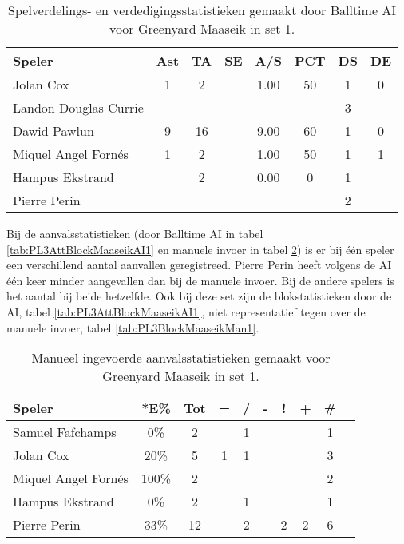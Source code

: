 \begin{table}[ht!]
  \centering
  \scriptsize
  \begin{tabular}{|l|c|c|c|c|c|c|c|} \hline
    \textbf{Speler} & Ast & TA & SE & A/S & PCT & DS & DE \\ \hline
    Jolan Cox & 1 & 2 &  & 1.00 & 50 & 1 & 0 \\
    Landon Douglas Currie &  &  &  &   &   & 3 &   \\
    Dawid Pawlun & 9 & 16 &  & 9.00 & 60 & 1 & 0 \\
    Miquel Angel Fornés & 1 & 2 &  & 1.00 & 50 & 1 & 1 \\
    Hampus Ekstrand &  & 2 &  & 0.00 & 0 & 1 & \\
    Pierre Perin &   &   &   &   &   & 2 &   \\ \hline
  \end{tabular}
  \caption[Spelverdelings- en verdedigingsstatistieken gemaakt door Balltime AI voor Greenyard Maaseik in set 1]{\label{tab:PL3SetDigMaaseikAI1}Spelverdelings- en verdedigingsstatistieken gemaakt door Balltime AI voor Greenyard Maaseik in set 1.}
\end{table}

Bij de aanvalsstatistieken (door Balltime AI in tabel \ref{tab:PL3AttBlockMaaseikAI1} en manuele invoer in tabel \ref{tab:PL3AttMaaseikMan1}) is er bij één speler een verschillend aantal aanvallen geregistreed. Pierre Perin heeft volgens de AI één keer minder aangevallen dan bij de manuele invoer. Bij de andere spelers is het aantal bij beide hetzelfde. Ook bij deze set zijn de blokstatistieken door de AI, tabel \ref{tab:PL3AttBlockMaaseikAI1}, niet representatief tegen over de manuele invoer, tabel \ref{tab:PL3BlockMaaseikMan1}.

\begin{table}[ht!]
    \centering
    \scriptsize
    \begin{tabular}{|l|c|c|c|c|c|c|c|c|c|} \hline
        \textbf{Speler} & *E\% & Tot & = & / & - & ! & + & \# \\ \hline
        Samuel Fafchamps & 0\% & 2 &  & 1 &  &  &  & 1 \\ 
        Jolan Cox & 20\% & 5 & 1 & 1 &  &  &  & 3 \\ 
        Miquel Angel Fornés & 100\% & 2 &  &  &  &  &  & 2 \\ 
        Hampus Ekstrand & 0\% & 2 &  & 1 &  &  &  & 1 \\ 
        Pierre Perin & 33\% & 12 &  & 2 &  & 2 & 2 & 6 \\ \hline
    \end{tabular}
    \caption[Manueel ingevoerde aanvalsstatistieken gemaakt Greenyard Maaseik in set 1]{\label{tab:PL3AttMaaseikMan1}Manueel ingevoerde aanvalsstatistieken gemaakt voor Greenyard Maaseik in set 1.}
\end{table}

